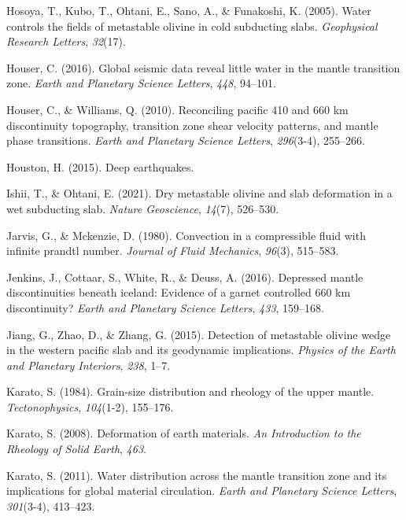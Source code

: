 \documentclass[draft,linenumbers]{agujournal2019}
\newlength{\cslhangindent}
\newenvironment{CSLReferences}[2]
 {\begin{list}{}{
  \setlength{\itemindent}{0pt}
  \setlength{\leftmargin}{0pt}
  \setlength{\parsep}{0pt}
  \ifodd #1
   \setlength{\leftmargin}{\cslhangindent}
   \setlength{\itemindent}{-\cslhangindent}
  \fi
  \setlength{\itemsep}{#2\baselineskip}
  }
  \item\relax}
 {\end{list}}
\begin{document}
\begin{CSLReferences}{1}{0}
Hosoya, T., Kubo, T., Ohtani, E., Sano, A., \& Funakoshi, K. (2005).
Water controls the fields of metastable olivine in cold subducting
slabs. \emph{Geophysical Research Letters}, \emph{32}(17).

Houser, C. (2016). Global seismic data reveal little water in the mantle
transition zone. \emph{Earth and Planetary Science Letters}, \emph{448},
94--101.

Houser, C., \& Williams, Q. (2010). Reconciling pacific 410 and 660 km
discontinuity topography, transition zone shear velocity patterns, and
mantle phase transitions. \emph{Earth and Planetary Science Letters},
\emph{296}(3-4), 255--266.

Houston, H. (2015). Deep earthquakes.

Ishii, T., \& Ohtani, E. (2021). Dry metastable olivine and slab
deformation in a wet subducting slab. \emph{Nature Geoscience},
\emph{14}(7), 526--530.

Jarvis, G., \& Mckenzie, D. (1980). Convection in a compressible fluid
with infinite prandtl number. \emph{Journal of Fluid Mechanics},
\emph{96}(3), 515--583.

Jenkins, J., Cottaar, S., White, R., \& Deuss, A. (2016). Depressed
mantle discontinuities beneath iceland: Evidence of a garnet controlled
660 km discontinuity? \emph{Earth and Planetary Science Letters},
\emph{433}, 159--168.

Jiang, G., Zhao, D., \& Zhang, G. (2015). Detection of metastable
olivine wedge in the western pacific slab and its geodynamic
implications. \emph{Physics of the Earth and Planetary Interiors},
\emph{238}, 1--7.

Karato, S. (1984). Grain-size distribution and rheology of the upper
mantle. \emph{Tectonophysics}, \emph{104}(1-2), 155--176.

Karato, S. (2008). Deformation of earth materials. \emph{An Introduction
to the Rheology of Solid Earth}, \emph{463}.

Karato, S. (2011). Water distribution across the mantle transition zone
and its implications for global material circulation. \emph{Earth and
Planetary Science Letters}, \emph{301}(3-4), 413--423.


\end{CSLReferences}
\end{document}
